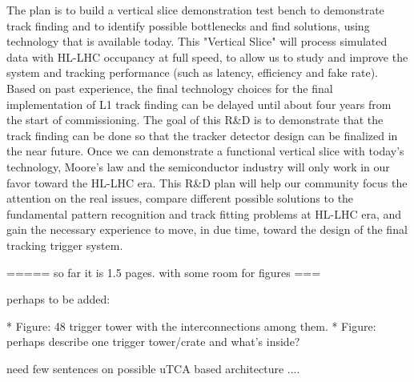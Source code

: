 	The plan is to build a vertical slice demonstration test bench to demonstrate track finding and to identify possible bottlenecks and find solutions, using technology that is available today. This "Vertical Slice" will process simulated data with HL-LHC occupancy at full speed, to allow us to study and improve the system and tracking performance (such as latency, efficiency and fake rate). Based on past experience, the final technology choices for the final implementation of L1 track finding can be delayed until about four years from the start of commissioning. The goal of this R\&D is to demonstrate that the track finding can be done so that the tracker detector design can be finalized in the near future. Once we can demonstrate a functional vertical slice with today's technology, Moore's law and the semiconductor industry will only work in our favor toward the HL-LHC era. This R\&D plan will help our community focus the attention on the real issues, compare different possible solutions to the fundamental pattern recognition and track fitting problems at HL-LHC era, and gain the necessary experience to move, in due time, toward the design of the final tracking trigger system.


=====  so far it is 1.5 pages. with some room for figures ===

perhaps to be added:

* Figure:   48 trigger tower with the interconnections among them. 
* Figure:   perhaps describe one trigger tower/crate and what's inside? 

need few sentences on possible uTCA based architecture ....

